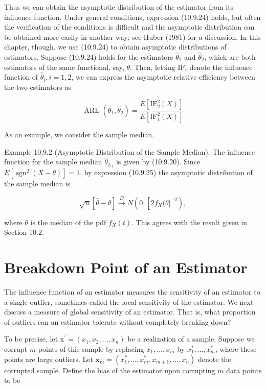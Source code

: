 Thus we can obtain the asymptotic distribution of the estimator from its influence function. Under general conditions, expression (10.9.24) holds, but often the verification of the conditions is difficult and the asymptotic distribution can be obtained more easily in another way; see Huber (1981) for a discussion. In this chapter, though, we use (10.9.24) to obtain asymptotic distributions of estimators. Suppose (10.9.24) holds for the estimators $\widehat{\theta}_{1}$ and $\widehat{\theta}_{2}$, which are both estimators of the same functional, say, $\theta$. Then, letting $\mathrm{IF}_{i}$ denote the influence function of $\widehat{\theta}_{i}, i=1,2$, we can express the asymptotic relative efficiency between the two estimators as


\begin{equation*}
\operatorname{ARE}\left(\widehat{\theta}_{1}, \widehat{\theta}_{2}\right)=\frac{E\left[\mathrm{IF}_{2}^{2}(X)\right]}{E\left[\mathrm{IF}_{1}^{2}(X)\right]} \tag{10.9.26}
\end{equation*}


As an example, we consider the sample median.

Example 10.9.2 (Asymptotic Distribution of the Sample Median). The influence function for the sample median $\widehat{\theta}_{L_{1}}$ is given by (10.9.20). Since $E\left[\operatorname{sgn}^{2}(X-\theta)\right]=1$, by expression (10.9.25) the asymptotic distribution of the sample median is

$$
\sqrt{n}[\hat{\theta}-\theta] \xrightarrow{D} N\left(0,\left[2 f_{X}(\theta]^{-2}\right),\right.
$$

where $\theta$ is the median of the pdf $f_{X}(t)$. This agrees with the result given in Section 10.2.

\section*{Breakdown Point of an Estimator}
The influence function of an estimator measures the sensitivity of an estimator to a single outlier, sometimes called the local sensitivity of the estimator. We next discuss a measure of global sensitivity of an estimator. That is, what proportion of outliers can an estimator tolerate without completely breaking down?

To be precise, let $\mathrm{x}^{\prime}=\left(x_{1}, x_{2}, \ldots, x_{n}\right)$ be a realization of a sample. Suppose we corrupt $m$ points of this sample by replacing $x_{1}, \ldots, x_{m}$ by $x_{1}^{*}, \ldots, x_{m}^{*}$, where these points are large outliers. Let $\mathbf{x}_{m}=\left(x_{1}^{*}, \ldots, x_{m}^{*}, x_{m+1}, \ldots, x_{n}\right)$ denote the corrupted sample. Define the bias of the estimator upon corrupting $m$ data points to be



